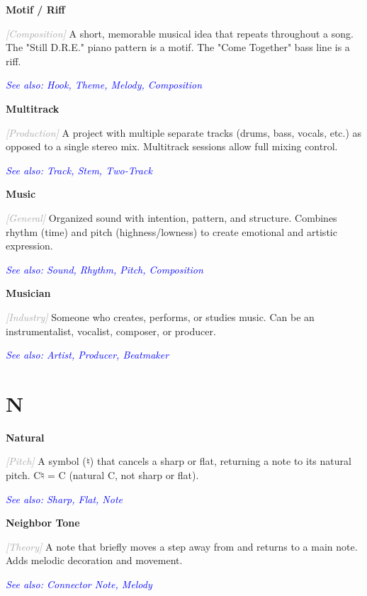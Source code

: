 \documentclass[11pt,letterpaper]{article}
\newcommand{\term}[1]{\textbf{\large\color{purple}#1}}
\newcommand{\category}[1]{\textcolor{darkgray}{\textit{\small [#1]}}}
\newcommand{\seealso}[1]{\textcolor{blue}{\textit{See also: #1}}}
\newenvironment{termdef}[1]
  {\noindent\term{#1}\par\nopagebreak}
  {\par\vspace{0.3em}}
\begin{document}
\begin{termdef}{Motif / Riff}
\category{Composition}
A short, memorable musical idea that repeats throughout a song. The "Still D.R.E." piano pattern is a motif. The "Come Together" bass line is a riff.

\seealso{Hook, Theme, Melody, Composition}
\end{termdef}

\begin{termdef}{Multitrack}
\category{Production}
A project with multiple separate tracks (drums, bass, vocals, etc.) as opposed to a single stereo mix. Multitrack sessions allow full mixing control.

\seealso{Track, Stem, Two-Track}
\end{termdef}

\begin{termdef}{Music}
\category{General}
Organized sound with intention, pattern, and structure. Combines rhythm (time) and pitch (highness/lowness) to create emotional and artistic expression.

\seealso{Sound, Rhythm, Pitch, Composition}
\end{termdef}

\begin{termdef}{Musician}
\category{Industry}
Someone who creates, performs, or studies music. Can be an instrumentalist, vocalist, composer, or producer.

\seealso{Artist, Producer, Beatmaker}
\end{termdef}


\section*{N}

\begin{termdef}{Natural}
\category{Pitch}
A symbol (♮) that cancels a sharp or flat, returning a note to its natural pitch. C♮ = C (natural C, not sharp or flat).

\seealso{Sharp, Flat, Note}
\end{termdef}

\begin{termdef}{Neighbor Tone}
\category{Theory}
A note that briefly moves a step away from and returns to a main note. Adds melodic decoration and movement.

\seealso{Connector Note, Melody}
\end{termdef}
\end{document}
